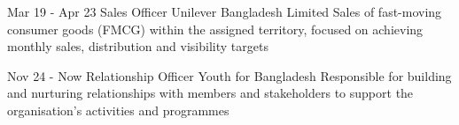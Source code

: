 
\cvevent
{Mar 19 - Apr 23}
{Sales Officer}
{Unilever Bangladesh Limited}
{Sales of fast-moving consumer goods (FMCG) within the assigned territory, focused on achieving monthly sales, distribution and visibility targets}
{}
{}
{}


\cvevent
{Nov 24 - Now}
{Relationship Officer}
{Youth for Bangladesh}
{Responsible for building and nurturing relationships with members and stakeholders to support the organisation's activities and programmes}
{}
{}
{}
